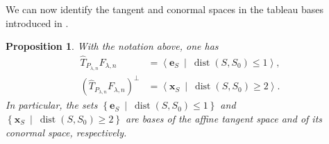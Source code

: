 \documentclass[a4paper,reqno]{amsart}
\theoremstyle{plainnopunct}
\newtheorem{proposition}[proposition]{Proposition}
\theoremstyle{definitionnopunct}
\newcommand{\dist}{\operatorname{dist}}
\newcommand{\be}{\mathbf{e}}
\newcommand{\bx}{\mathbf{x}}
\begin{document}
We can now identify the tangent and conormal spaces in the tableau
bases introduced in .

\begin{proposition}\label{prop: tangent and conormal bases}
With the notation above, one has
\begin{align}
\widehat{T}_{P_{\lambda,n}}F_{\lambda,n}
&=
\left\langle
\be_S
\ \middle|\
\dist(S,S_0)\leq1
\right\rangle,
\label{eq: tangent basis distance}
\\
\left(
\widehat{T}_{P_{\lambda,n}}F_{\lambda,n}
\right)^\perp
&=
\left\langle
\bx_S
\ \middle|\
\dist(S,S_0)\geq2
\right\rangle.
\label{eq: tangent apolar distance}
\end{align}
In particular, the sets $\left\{
\be_S
\ \middle|\
\dist(S,S_0)\leq1
\right\}$ and $\left\{
\bx_S
\ \middle|\
\dist(S,S_0)\geq2
\right\}$ are bases of the affine tangent space and of its conormal space, respectively.
\end{proposition}
\end{document}
